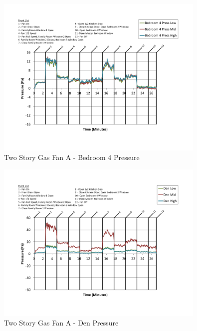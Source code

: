 \documentclass{article}
\begin{document}
\begin{appendices}
	\begin{figure}[H]
		\centering
		\includegraphics[height=3.05in,trim=0.67in 1.1in 0.67in 0.8in,clip=true]{0_Images/Results_Charts/ColdFlow/Two_Story/Gas/A/Bedroom_4_Pressure.pdf}
		\caption{Two Story Gas Fan A - Bedroom 4 Pressure}
	\end{figure}
 

	\begin{figure}[H]
		\centering
		\includegraphics[height=3.05in,trim=0.67in 1.1in 0.67in 0.8in,clip=true]{0_Images/Results_Charts/ColdFlow/Two_Story/Gas/A/Den_Pressure.pdf}
		\caption{Two Story Gas Fan A - Den Pressure}
	\end{figure}
 
	\clearpage


\end{appendices}
\end{document}
